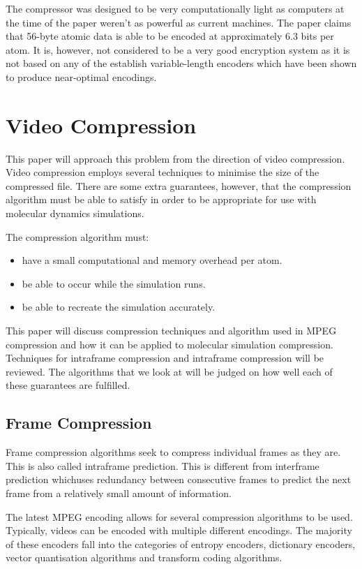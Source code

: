 \documentclass[twocolumn, a4paper,10pt]{article}
\begin{document}
The compressor was designed to be very computationally light as computers at the time of the paper weren't as powerful as current machines. The paper claims that 56-byte atomic data is able to be encoded at approximately 6.3 bits per atom. It is, however, not considered to be a very good encryption system as it is not based on any of the establish variable-length encoders which have been shown to produce near-optimal encodings.

\section*{Video Compression}

This paper will approach this problem from the direction of video compression. Video compression employs several techniques to minimise the size of the compressed file. There are some extra guarantees, however, that the compression algorithm must be able to satisfy in order to be appropriate for use with molecular dynamics simulations. 

The compression algorithm must:
\begin{itemize}
  \item have a small computational and memory overhead per atom. 
  \item be able to occur while the simulation runs.
  \item be able to recreate the simulation accurately.
\end{itemize}

This paper will discuss compression techniques and algorithm used in MPEG compression and how it can be applied to molecular simulation compression. Techniques for intraframe compression and intraframe compression will be reviewed. The algorithms that we look at will be judged on how well each of these guarantees are fulfilled. 

\subsection*{Frame Compression}

Frame compression algorithms seek to compress individual frames as they are. This is also called intraframe prediction. This is different from interframe prediction whichuses redundancy between consecutive frames to predict the next frame from a relatively small amount of information. 

The latest MPEG encoding allows for several compression algorithms to be used\cite{gall1991mvc}. Typically, videos can be encoded with multiple different encodings. The majority of these encoders fall into the categories of entropy encoders, dictionary encoders, vector quantisation algorithms and transform coding algorithms. 
\end{document}
